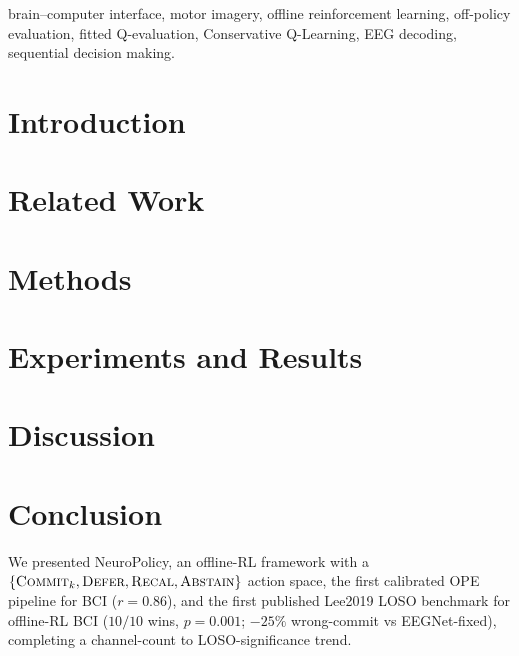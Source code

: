 \documentclass[conference]{IEEEtran}
\newcommand{\nettype}{NeuroPolicy}
\begin{document}
\begin{IEEEkeywords}
brain--computer interface, motor imagery, offline reinforcement learning,
off-policy evaluation, fitted Q-evaluation, Conservative Q-Learning,
EEG decoding, sequential decision making.
\end{IEEEkeywords}

\section{Introduction}\label{sec:intro}


\section{Related Work}\label{sec:related}


\section{Methods}\label{sec:methods}


\section{Experiments and Results}\label{sec:results}


\section{Discussion}\label{sec:discussion}


\section{Conclusion}\label{sec:conclusion}
We presented \nettype{}, an offline-RL framework with a
$\{\textsc{Commit}_k, \textsc{Defer}, \textsc{Recal},
\textsc{Abstain}\}$ action space, the first calibrated OPE
pipeline for BCI ($r\!=\!0.86$), and the first published Lee2019
LOSO benchmark for offline-RL BCI ($10/10$ wins, $p\!=\!0.001$;
$-25\%$ wrong-commit vs EEGNet-fixed), completing a channel-count
to LOSO-significance trend.
\end{document}
